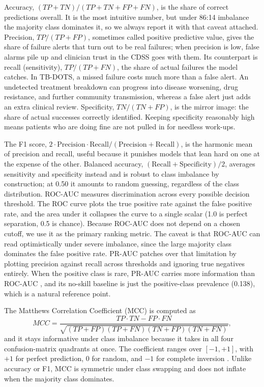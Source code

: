 \documentclass[12pt]{article}
\renewcommand{\_}{\textunderscore\allowbreak}
\begin{document}
Accuracy, $(TP+TN)/(TP+TN+FP+FN)$, is the share of correct predictions overall. It is the most intuitive number, but under 86:14 imbalance the majority class dominates it, so we always report it with that caveat attached. Precision, $TP/(TP+FP)$, sometimes called positive predictive value, gives the share of failure alerts that turn out to be real failures; when precision is low, false alarms pile up and clinician trust in the CDSS goes with them. Its counterpart is recall (sensitivity), $TP/(TP+FN)$, the share of actual failures the model catches. In TB-DOTS, a missed failure costs much more than a false alert. An undetected treatment breakdown can progress into disease worsening, drug resistance, and further community transmission, whereas a false alert just adds an extra clinical review. Specificity, $TN/(TN+FP)$, is the mirror image: the share of actual successes correctly identified. Keeping specificity reasonably high means patients who are doing fine are not pulled in for needless work-ups.

The F1 score, $2 \cdot \text{Precision} \cdot \text{Recall} / (\text{Precision} + \text{Recall})$, is the harmonic mean of precision and recall, useful because it punishes models that lean hard on one at the expense of the other. Balanced accuracy, $(\text{Recall}+\text{Specificity})/2$, averages sensitivity and specificity instead and is robust to class imbalance by construction; at 0.50 it amounts to random guessing, regardless of the class distribution. ROC-AUC measures discrimination across every possible decision threshold. The ROC curve plots the true positive rate against the false positive rate, and the area under it collapses the curve to a single scalar (1.0 is perfect separation, 0.5 is chance). Because ROC-AUC does not depend on a chosen cutoff, we use it as the primary ranking metric. The caveat is that ROC-AUC can read optimistically under severe imbalance, since the large majority class dominates the false positive rate. PR-AUC patches over that limitation by plotting precision against recall across thresholds and ignoring true negatives entirely. When the positive class is rare, PR-AUC carries more information than ROC-AUC \citep{davis2006relationship}, and its no-skill baseline is just the positive-class prevalence (0.138), which is a natural reference point.

The Matthews Correlation Coefficient (MCC) is computed as
\[
MCC = \frac{TP \cdot TN - FP \cdot FN}{\sqrt{(TP+FP)(TP+FN)(TN+FP)(TN+FN)}},
\]
and it stays informative under class imbalance because it takes in all four confusion-matrix quadrants at once. The coefficient ranges over $[-1,+1]$, with $+1$ for perfect prediction, $0$ for random, and $-1$ for complete inversion \citep{chicco2020advantages}. Unlike accuracy or F1, MCC is symmetric under class swapping and does not inflate when the majority class dominates.
\end{document}
